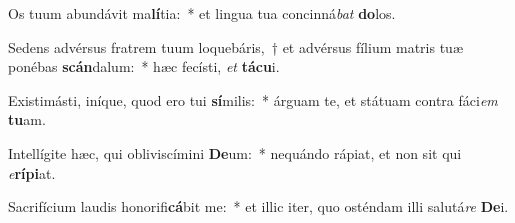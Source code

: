 \item Os tuum abundávit ma\textbf{lí}tia:~* et lingua tua concinná\textit{bat} \textbf{do}los.
\item Sedens advérsus fratrem tuum loquebáris,~† et advérsus fílium matris tuæ ponébas \textbf{scán}dalum:~* hæc fecísti, \textit{et} \textbf{tá}\textbf{cu}i.
\item Existimásti, iníque, quod ero tui \textbf{sí}milis:~* árguam te, et státuam contra fáci\textit{em} \textbf{tu}am.
\item Intellígite hæc, qui obliviscímini \textbf{De}um:~* nequándo rápiat, et non sit qui \textit{e}\textbf{rí}\textbf{pi}at.
\item Sacrifícium laudis honorifi\textbf{cá}bit me:~* et illic iter, quo osténdam illi salutá\textit{re} \textbf{De}i.
